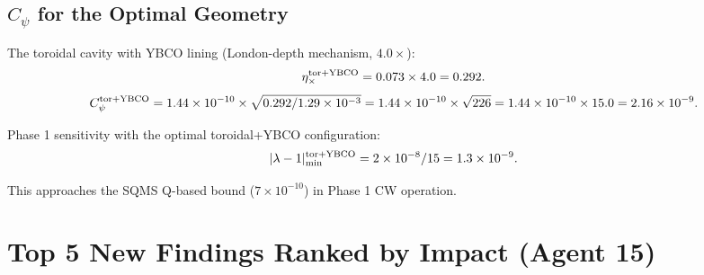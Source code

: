 \documentclass[11pt]{article}
\newcommand{\ee}[1]{\times 10^{#1}}
\begin{document}
\subsection{$C_\psi$ for the Optimal Geometry}

The toroidal cavity with YBCO lining (London-depth mechanism, $4.0\times$):
\begin{equation}
\eta_\times^{\rm tor+YBCO} = 0.073 \times 4.0 = 0.292.
\end{equation}
\begin{equation}
C_\psi^{\rm tor+YBCO} = 1.44\ee{-10} \times \sqrt{0.292/1.29\ee{-3}}
= 1.44\ee{-10} \times \sqrt{226} = 1.44\ee{-10} \times 15.0 = 2.16\ee{-9}.
\end{equation}

Phase 1 sensitivity with the optimal toroidal+YBCO configuration:
\begin{equation}
|\lambda-1|_{\rm min}^{\rm tor+YBCO} = 2\ee{-8}/15 = 1.3\ee{-9}.
\end{equation}

This approaches the SQMS Q-based bound ($7\ee{-10}$) in Phase 1 CW operation.

\section{Top 5 New Findings Ranked by Impact (Agent 15)}
\label{sec:a15-top5}
\end{document}
